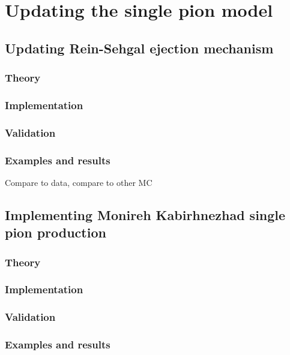 \chapter{Updating the single pion model}
\label{chap:1pi_update}

\section{Updating Rein-Sehgal ejection mechanism}
\label{sec:1pi_update:RS_ej}
\subsection{Theory}
\subsection{Implementation}
\subsection{Validation}
\subsection{Examples and results}
Compare to data, compare to other MC

\section{Implementing Monireh Kabirhnezhad single pion production}
\label{sec:1pi_update:Minoo}
\subsection{Theory}
\subsection{Implementation}
\subsection{Validation}
\subsection{Examples and results}
